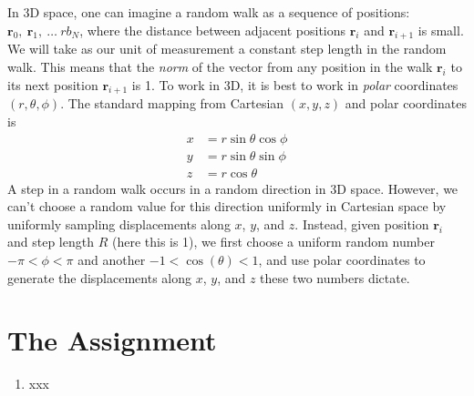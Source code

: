 \documentclass[11pt]{article}
\newcommand{\uu}[1]{{\boldsymbol #1}}
\def\rb{\uu{r}}
\begin{document}
In 3D space, one can imagine a random walk as a sequence of positions: $\rb_0,\ \rb_1,\ \dots\ rb_N$, where the distance between adjacent positions $\rb_{i}$ and $\rb_{i+1}$ is small.  We will take as our unit of measurement a constant step length in the random walk.  This means that the {\em norm} of the vector from any position in the walk $\rb_i$ to its next position $\rb_{i+1}$ is 1.  To work in 3D, it is best to work in {\em polar} coordinates $(r,\theta,\phi)$.  The standard mapping from Cartesian $(x,y,z)$ and polar coordinates is
%
\begin{align*}
x & = r \sin\theta \cos\phi\\
y & = r \sin\theta \sin\phi\\
z & = r \cos\theta
\end{align*}
%
A step in a random walk occurs in a random direction in 3D space.  However, we can't choose a random value for this direction uniformly in Cartesian space by uniformly sampling displacements along $x$, $y$, and $z$.   Instead, given position $\rb_i$ and step length $R$ (here this is 1), we first choose a uniform random number $-\pi<\phi<\pi$ and another $-1<\cos(\theta)<1$, and use polar coordinates to generate the displacements along $x$, $y$, and $z$ these two numbers dictate.  

\section*{The Assignment}

\begin{enumerate}
	\item xxx
\end{enumerate}
\end{document}
